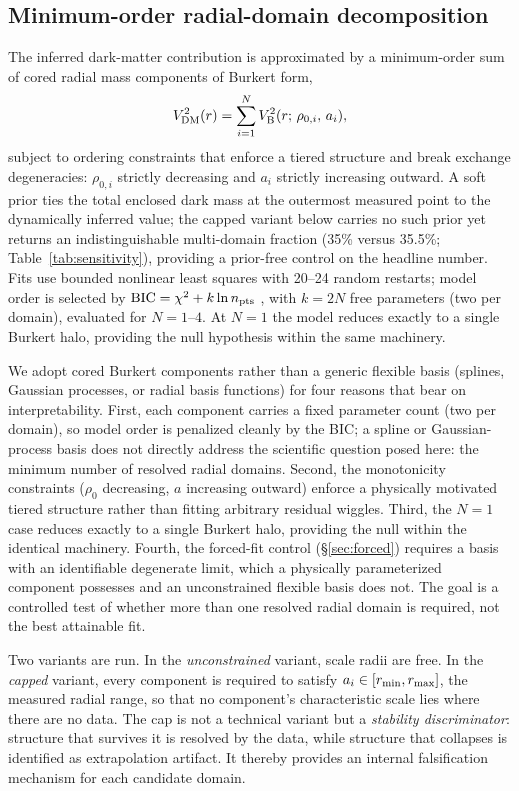 \documentclass[twocolumn]{aastex701}
\begin{document}
\subsection{Minimum-order radial-domain decomposition}
\label{sec:tiers}

The inferred dark-matter contribution is approximated by a minimum-order sum
of cored radial mass components of Burkert form,
\begin{equation}
V^2_{\rm DM}(r) = \sum_{i=1}^{N} V^2_{\rm B}(r;\,\rho_{0,i},\,a_i),
\end{equation}
subject to ordering constraints that enforce a tiered structure and break
exchange degeneracies: $\rho_{0,i}$ strictly decreasing and $a_i$ strictly
increasing outward. A soft prior ties the total enclosed dark mass at the
outermost measured point to the dynamically inferred value; the capped
variant below carries no such prior yet returns an indistinguishable
multi-domain fraction (35\% versus 35.5\%; Table~\ref{tab:sensitivity}),
providing a prior-free control on the headline number. Fits use bounded
nonlinear least squares with 20--24 random restarts; model order is selected
by ${\rm BIC} = \chi^2 + k \ln n_{\rm pts}$ \citep{Schwarz1978,Liddle2007}, with $k = 2N$ free
parameters (two per domain), evaluated for $N = 1$--$4$.
At $N = 1$ the model reduces exactly to a single Burkert halo, providing the
null hypothesis within the same machinery.

We adopt cored Burkert components rather than a generic flexible basis (splines,
Gaussian processes, or radial basis functions) for four reasons that bear on
interpretability. First, each component carries a fixed parameter count (two per
domain), so model order is penalized cleanly by the BIC; a spline or Gaussian-process
basis does not directly address the scientific question posed here: the minimum
number of resolved radial domains. Second,
the monotonicity constraints ($\rho_0$ decreasing, $a$ increasing outward) enforce a
physically motivated tiered structure rather than fitting arbitrary residual wiggles.
Third, the $N=1$ case reduces exactly to a single Burkert halo, providing the null
within the identical machinery. Fourth, the forced-fit control (\S\ref{sec:forced})
requires a basis with an identifiable degenerate limit, which a physically
parameterized component possesses and an unconstrained flexible basis does not. The
goal is a controlled test of whether more than one resolved radial domain is required,
not the best attainable fit.

Two variants are run. In the \emph{unconstrained} variant, scale radii are
free. In the \emph{capped} variant, every component is required to satisfy
$a_i \in [r_{\rm min}, r_{\rm max}]$, the measured radial range, so that no
component's characteristic scale lies where there are no data. The cap is not
a technical variant but a \emph{stability discriminator}: structure that
survives it is resolved by the data, while structure that collapses is
identified as extrapolation artifact. It thereby provides an internal
falsification mechanism for each candidate domain.
\end{document}

